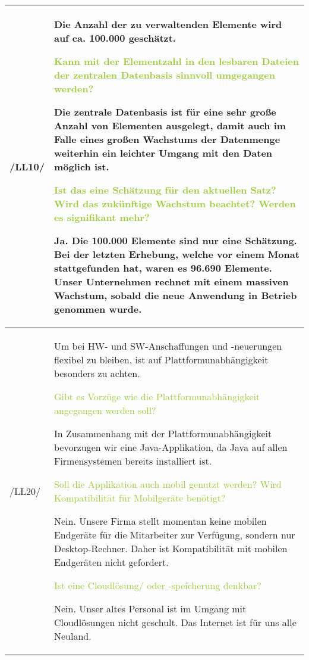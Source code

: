 \begin{center}
    \begin{tabular}[ht] {l | p{13cm}}
        \hline
        /LL10/ & Die Anzahl der zu verwaltenden Elemente wird auf ca. 100.000 geschätzt. 
        
        \textcolor{YellowGreen}{Kann mit der Elementzahl in den lesbaren Dateien der zentralen Datenbasis sinnvoll umgegangen werden?}

        \textcolor{NavyBlue}{Die zentrale Datenbasis ist für eine sehr große Anzahl von Elementen ausgelegt, damit auch im Falle eines großen Wachstums der Datenmenge weiterhin ein leichter Umgang mit den Daten möglich ist.}

        \textcolor{YellowGreen}{Ist das eine Schätzung für den \grqq{}aktuellen\grqq{} Satz? Wird das zukünftige Wachstum beachtet? Werden es signifikant mehr?}
        
        \textcolor{NavyBlue}{Ja. Die 100.000 Elemente sind nur eine Schätzung. Bei der letzten Erhebung, welche vor einem Monat stattgefunden hat, waren es 96.690 Elemente. Unser Unternehmen rechnet mit einem massiven Wachstum, sobald die neue Anwendung in Betrieb genommen wurde.}



        \\
        \hline
        /LL20/ & Um bei HW- und SW-Anschaffungen und -neuerungen flexibel zu bleiben, ist auf Plattformunabhängigkeit besonders zu achten. 
        
        \textcolor{YellowGreen}{Gibt es Vorzüge wie die Plattformunabhängigkeit angegangen werden soll?}

        \textcolor{NavyBlue}{In Zusammenhang mit der Plattformunabhängigkeit bevorzugen wir eine Java-Applikation, da Java auf allen Firmensystemen bereits installiert ist.}

        \textcolor{YellowGreen}{Soll die Applikation auch mobil genutzt werden? Wird Kompatibilität für Mobilgeräte benötigt?}

        \textcolor{NavyBlue}{Nein. Unsere Firma stellt momentan keine mobilen Endgeräte für die Mitarbeiter zur Verfügung, sondern nur Desktop-Rechner. Daher ist Kompatibilität mit mobilen Endgeräten nicht gefordert.}

        \textcolor{YellowGreen}{Ist eine Cloudlösung/ oder -speicherung denkbar?}

        \textcolor{NavyBlue}{Nein. Unser altes Personal ist im Umgang mit Cloudlösungen nicht geschult. Das Internet ist für uns alle Neuland.}

        \\
        \hline
    \end{tabular}
\end{center}

